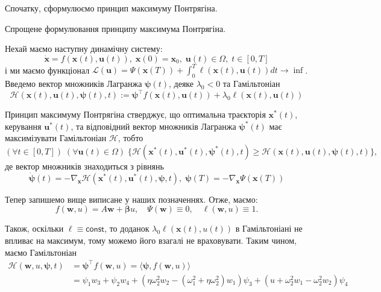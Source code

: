 \documentclass{hw_template}
\begin{document}
Спочатку, сформулюємо принцип максимуму Понтрягіна.

\begin{lemma}{Спрощене формулювання принципу максимума Понтрягіна.} 

Нехай маємо наступну динамічну систему:
\begin{equation*}
    \dot{\mathbf{x}} = f(\mathbf{x}(t), \mathbf{u}(t)), \; \mathbf{x}(0) = \mathbf{x}_0, \; \mathbf{u}(t) \in \Omega, \; t \in [0,T]
\end{equation*}
і ми маємо функціонал $\mathcal{L}(\mathbf{u}) = \Psi(\mathbf{x}(T)) + \int_0^T \ell(\mathbf{x}(t), \mathbf{u}(t))dt \to \inf$. Введемо вектор множників Лагранжа $\boldsymbol{\psi}(t)$, деяке $\lambda_0 < 0$ та Гамільтоніан
\begin{equation*}
    \mathcal{H}(\mathbf{x}(t), \mathbf{u}(t), \boldsymbol{\psi}(t), t) := \boldsymbol{\psi}^{\top}f(\mathbf{x}(t), \mathbf{u}(t)) + \lambda_0\ell(\mathbf{x}(t), \mathbf{u}(t))
\end{equation*}

Принцип максимуму Понтрягіна стверджує, що оптимальна траєкторія $\mathbf{x}^*(t)$, керування $\mathbf{u}^*(t)$, та відповідний вектор множників Лагранжа $\boldsymbol{\psi}^*(t)$ має максимізувати Гамільтоніан $\mathcal{H}$, тобто
\begin{equation*}\label{pontryagin-condition-1}
    (\forall t \in [0,T]) \; (\forall \mathbf{u}(t) \in \Omega)\; \{\mathcal{H}(\mathbf{x}^*(t), \mathbf{u}^*(t), \boldsymbol{\psi}^*(t), t) \geq \mathcal{H}(\mathbf{x}(t), \mathbf{u}(t), \boldsymbol{\psi}(t), t)\},
\end{equation*}
де вектор множників знаходиться з рівнянь
\begin{equation*}\label{pontryagin-condition-2}
    \dot{\boldsymbol{\psi}}(t) = -\nabla_{\mathbf{x}} \mathcal{H}(\mathbf{x}^*(t), \mathbf{u}^*(t), \boldsymbol{\psi},t), \; \boldsymbol{\psi}(T) = -\nabla_{\mathbf{x}}\Psi(\mathbf{x}(T))
\end{equation*}
\end{lemma}

Тепер запишемо вище виписане у наших позначеннях. Отже, маємо:
\begin{equation*}
    f(\boldsymbol{w}, u) = A\boldsymbol{w} + \boldsymbol{\beta}u, \quad \Psi(\boldsymbol{w}) \equiv 0, \quad \ell(\boldsymbol{w}, u) \equiv 1.
\end{equation*}

Також, оскільки $\ell \equiv \mathsf{const}$, то доданок $\lambda_0\ell(\mathbf{x}(t), u(t))$ в Гамільтоніані не впливає на максимум, тому можемо його взагалі не враховувати. Таким чином, маємо Гамільтоніан
\begin{align*}
    \mathcal{H}(\boldsymbol{w}, u, \boldsymbol{\psi}, t) & = \boldsymbol{\psi}^{\top}f(\boldsymbol{w}, u) = \langle \boldsymbol{\psi}, f(\boldsymbol{w}, u) \rangle \\
    & = \psi_1w_3 + \psi_2w_4 + (\eta \omega_2^2w_2 - (\omega_1^2+\eta\omega_2^2)w_1)\psi_3 + (u+\omega_2^2w_1 - \omega_2^2w_2)\psi_4
\end{align*}
\end{document}

